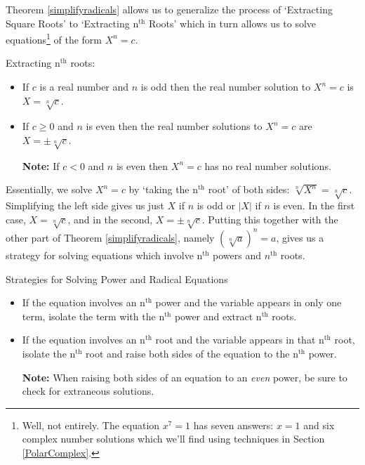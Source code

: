 Theorem \ref{simplifyradicals} allows us to generalize the process of `Extracting Square Roots' to `Extracting $\text{n}^{\text{th}}$ Roots' which in turn allows us to solve equations\footnote{Well, not entirely.  The equation $x^{7} = 1$ has seven answers: $x = 1$ and six complex number solutions which we'll find using techniques in Section \ref{PolarComplex}.} of the form $X^n  = c$.

\begin{floatbox}{Extracting $\text{n}^{\text{th}}$ roots:}
\label{extractingnthroots}

\begin{itemize}[leftmargin=*]

\item If $c$ is a real number and $n$ is odd then the real number solution to $X^{n} = c$ is $X = \sqrt[n]{c}$.

\item  If $c \geq 0$ and $n$ is even then the real number solutions to $X^{n} = c$ are $X = \pm \sqrt[n]{c}$.

\textbf{Note:} If $c < 0$ and $n$ is even then $X^{n} = c$ has no real number solutions.

\end{itemize}

\end{floatbox}

Essentially, we solve $X^{n} = c$ by `taking the $\text{n}^{\text{th}}$ root' of both sides:  $\sqrt[n]{X^{n}} = \sqrt[n]{c}$. Simplifying the left side gives us just $X$ if $n$ is odd or $|X|$ if $n$ is even.  In the first case,  $X =  \sqrt[n]{c}$, and in the second, $X = \pm \sqrt[n]{c}$.  Putting this together with the other part of Theorem \ref{simplifyradicals}, namely $(\sqrt[n]{a})^n = a$, gives us a strategy for solving equations which involve $\text{n}^{\text{th}}$ powers and $n^{\text{th}}$ roots. 

\begin{floatbox}{Strategies for Solving Power and Radical Equations}
\label{solvepowerandradicaleqns}

\begin{itemize}[leftmargin=*]

\item  If the equation involves an $\text{n}^{\text{th}}$ power and the variable appears in only one term, isolate the term with the $\text{n}^{\text{th}}$ power and extract $\text{n}^{\text{th}}$ roots.

\item  If the equation involves an $\text{n}^{\text{th}}$ root and the variable appears in that $\text{n}^{\text{th}}$ root, isolate the $\text{n}^{\text{th}}$ root and raise both sides of the equation to the $\text{n}^{\text{th}}$ power.

\textbf{Note:}  When raising both sides of an equation to an \textit{even} power, be sure to check for extraneous solutions.

\end{itemize}

\end{floatbox}

